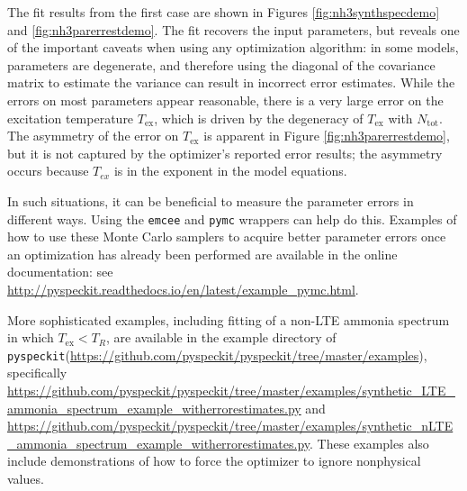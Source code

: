 \documentclass[twocolumn]{aastex62}
\newcommand{\pyspeckit}{\texttt{pyspeckit}\xspace}
\begin{document}
The fit results from the first case are shown in Figures
\ref{fig:nh3synthspecdemo} and \ref{fig:nh3parerrestdemo}.  The fit recovers
the input parameters, but reveals one of the important caveats when using any
optimization algorithm: in some models, parameters are degenerate, and
therefore using the diagonal of the covariance matrix to estimate the variance
can result in incorrect error estimates.  While the errors on most parameters
appear reasonable, there is a very large error on the excitation temperature
$T_{\mathrm{ex}}$, which is driven by the degeneracy of $T_{\mathrm{ex}}$ with
$N_\mathrm{tot}$.  The asymmetry of the error on $T_{\mathrm{ex}}$ is apparent
in Figure \ref{fig:nh3parerrestdemo}, but it is not captured by the optimizer's
reported error results; the asymmetry occurs because $T_{ex}$ is in the
exponent in the model equations.

In such situations, it can be beneficial to measure the parameter errors
in different ways.  Using the \texttt{emcee} and \texttt{pymc} wrappers
can help do this.  Examples of how to use these Monte Carlo samplers
to acquire better parameter errors once an optimization has already
been performed are available in the online documentation:
see \url{http://pyspeckit.readthedocs.io/en/latest/example_pymc.html}.

More sophisticated examples, including fitting of a non-LTE ammonia spectrum
in which $T_{\mathrm{ex}} < T_{R}$, are available in the example directory
of \pyspeckit (\url{https://github.com/pyspeckit/pyspeckit/tree/master/examples}),
specifically
\url{https://github.com/pyspeckit/pyspeckit/tree/master/examples/synthetic_LTE_ammonia_spectrum_example_witherrorestimates.py}
and
\url{https://github.com/pyspeckit/pyspeckit/tree/master/examples/synthetic_nLTE_ammonia_spectrum_example_witherrorestimates.py}.
These examples also include demonstrations of how to force the optimizer to
ignore nonphysical values.
\end{document}
